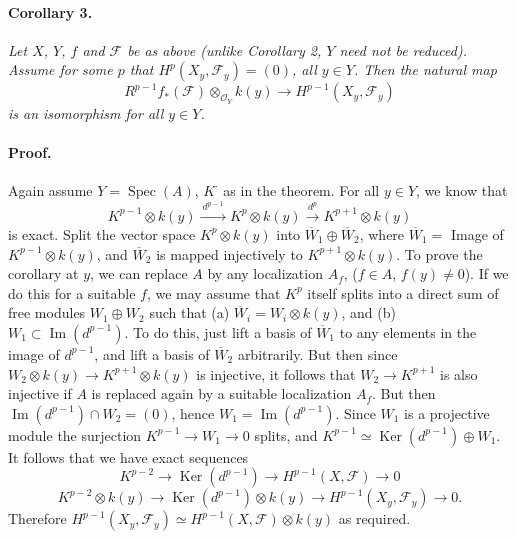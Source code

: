 

\DeclareMathOperator{\Ima}{Im}
\DeclareMathOperator{\Ker}{Ker}
\DeclareMathOperator{\Spec}{Spec}


\paragraph{Corollary 3.}
\textit{Let $X$, $Y$, $f$ and $\mathscr{F}$ be as above (unlike Corollary 2,
$Y$ need not be reduced). Assume for some $p$ that
$H^p(X_y, \mathscr{F}_y) = (0)$, all $y \in Y$. Then the natural map}
\[
  R^{p-1} f_*(\mathscr{F}) \otimes_{\mathcal{O}_Y} k(y) \to
  H^{p-1}(X_y, \mathscr{F}_y)
\]
\textit{is an isomorphism for all $y \in Y$.}

\paragraph{Proof.}
Again assume $Y = \Spec(A)$, $K^{\cdot}$ as in the theorem. For all
$y \in Y$, we know that
\[
  K^{p-1} \otimes k(y) \xrightarrow{\ d^{p-1}\ } K^p \otimes k(y)
  \xrightarrow{\ d^p\ } K^{p+1} \otimes k(y)
\]
is exact. Split the vector space $K^p \otimes k(y)$ into
$\overline{W}_1 \oplus \overline{W}_2$, where $\overline{W}_1 = $ Image of
$K^{p-1} \otimes k(y)$, and $\overline{W}_2$ is mapped injectively to
$K^{p+1} \otimes k(y)$. To prove the corollary at $y$, we can replace $A$ by
any localization $A_f$, ($f \in A$, $f(y) \neq 0$). If we do this for a
suitable $f$, we may assume that $K^p$ itself splits into a direct sum of
free modules $W_1 \oplus W_2$ such that (a) $\overline{W}_i = W_i \otimes k(y)$,
and (b) $W_1 \subset \Ima(d^{p-1})$. To do this, just lift a basis of
$\overline{W}_1$ to any elements in the image of $d^{p-1}$, and lift a basis
of $\overline{W}_2$ arbitrarily. But then since
$W_2 \otimes k(y) \to K^{p+1} \otimes k(y)$ is injective, it follows that
$W_2 \to K^{p+1}$ is also injective if $A$ is replaced again by a suitable
localization $A_f$. But then $\Ima(d^{p-1}) \cap W_2 = (0)$, hence
$W_1 = \Ima(d^{p-1})$. Since $W_1$ is a projective module the surjection
$K^{p-1} \to W_1 \to 0$ splits, and
$K^{p-1} \simeq \Ker(d^{p-1}) \oplus W_1$. It follows that we have exact
sequences
\[
  K^{p-2} \longrightarrow \Ker(d^{p-1}) \longrightarrow
  H^{p-1}(X, \mathscr{F}) \longrightarrow 0
\]
\[
  K^{p-2} \otimes k(y) \longrightarrow \Ker(d^{p-1}) \otimes k(y)
  \longrightarrow H^{p-1}(X_y, \mathscr{F}_y) \longrightarrow 0.
\]
Therefore
$H^{p-1}(X_y, \mathscr{F}_y) \simeq H^{p-1}(X, \mathscr{F}) \otimes k(y)$ as
required.

